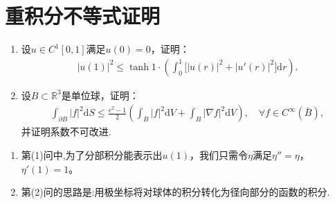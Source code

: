 \documentclass[../../main.tex]{subfiles}%
\begin{document}
\section{重积分不等式证明}

\begin{example}
\begin{enumerate}[(1)]
\item 设$u\in C^1[0,1]$满足$u(0)=0$，证明：
\begin{align*}
|u(1)|^2 \leqslant \tanh 1\cdot \left( \int_{0}^{1}\bigl[|u(r)|^2+|u'(r)|^2\bigr]\mathrm{d}r \right).
\end{align*}

\item 设$B\subset\mathbb{R}^3$是单位球，证明：
\begin{align*}
\int_{\partial B}|f|^2\mathrm{d}S\leqslant \frac{e^2-1}{2}\left( \int_{B}|f|^2\mathrm{d}V+\int_{B}|\nabla f|^2\mathrm{d}V \right),\quad \forall f\in C^\infty(\overline{B}),
\end{align*}
并证明系数不可改进.
\end{enumerate}
\end{example}
\begin{remark}
\begin{enumerate}[(1)]
\item 第(1)问中,为了分部积分能表示出$u(1)$，我们只需令$\eta$满足$\eta''=\eta$，$\eta'(1)=1$。

\item 第(2)问的思路是:用极坐标将对球体的积分转化为径向部分的函数的积分.
\end{enumerate}
\end{remark}
\end{document}
